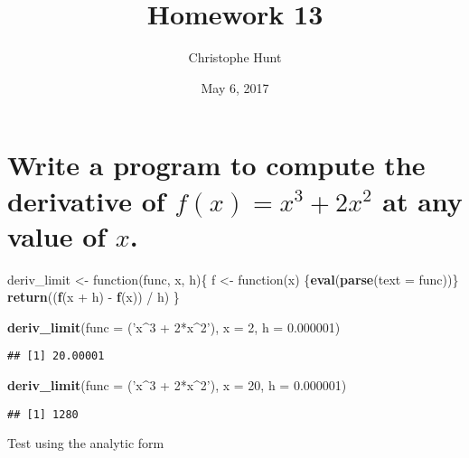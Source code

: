 \documentclass[]{article}
\title{Homework 13}
\author{Christophe Hunt}
\date{May 6, 2017}
\newenvironment{Shaded}{\begin{snugshade}}{\end{snugshade}}
\newcommand{\KeywordTok}[1]{\textcolor[rgb]{0.13,0.29,0.53}{\textbf{{#1}}}}
\newcommand{\DataTypeTok}[1]{\textcolor[rgb]{0.13,0.29,0.53}{{#1}}}
\newcommand{\DecValTok}[1]{\textcolor[rgb]{0.00,0.00,0.81}{{#1}}}
\newcommand{\FloatTok}[1]{\textcolor[rgb]{0.00,0.00,0.81}{{#1}}}
\newcommand{\StringTok}[1]{\textcolor[rgb]{0.31,0.60,0.02}{{#1}}}
\newcommand{\NormalTok}[1]{{#1}}
\begin{document}
\maketitle

{
\setcounter{tocdepth}{2}
\tableofcontents
}
\newpage

\section{\texorpdfstring{Write a program to compute the derivative of
\(f(x) = x^3 + 2x^2\) at any value of
\(x\).}{Write a program to compute the derivative of f(x) = x\^{}3 + 2x\^{}2 at any value of x.}}\label{write-a-program-to-compute-the-derivative-of-fx-x3-2x2-at-any-value-of-x.}

\begin{Shaded}
\begin{Highlighting}[]
\NormalTok{deriv_limit <-}\StringTok{ }\NormalTok{function(func, x, h)\{}
               \NormalTok{f <-}\StringTok{ }\NormalTok{function(x) \{}\KeywordTok{eval}\NormalTok{(}\KeywordTok{parse}\NormalTok{(}\DataTypeTok{text =} \NormalTok{func))\}}
               \KeywordTok{return}\NormalTok{((}\KeywordTok{f}\NormalTok{(x +}\StringTok{ }\NormalTok{h) -}\StringTok{ }\KeywordTok{f}\NormalTok{(x)) /}\StringTok{ }\NormalTok{h)}
               \NormalTok{\}}

\KeywordTok{deriv_limit}\NormalTok{(}\DataTypeTok{func =} \NormalTok{(}\StringTok{'x^3 + 2*x^2'}\NormalTok{), }\DataTypeTok{x =} \DecValTok{2}\NormalTok{, }\DataTypeTok{h =} \FloatTok{0.000001}\NormalTok{)}
\end{Highlighting}
\end{Shaded}

\begin{verbatim}
## [1] 20.00001
\end{verbatim}

\begin{Shaded}
\begin{Highlighting}[]
\KeywordTok{deriv_limit}\NormalTok{(}\DataTypeTok{func =} \NormalTok{(}\StringTok{'x^3 + 2*x^2'}\NormalTok{), }\DataTypeTok{x =} \DecValTok{20}\NormalTok{, }\DataTypeTok{h =} \FloatTok{0.000001}\NormalTok{)}
\end{Highlighting}
\end{Shaded}

\begin{verbatim}
## [1] 1280
\end{verbatim}

Test using the analytic form
\end{document}
